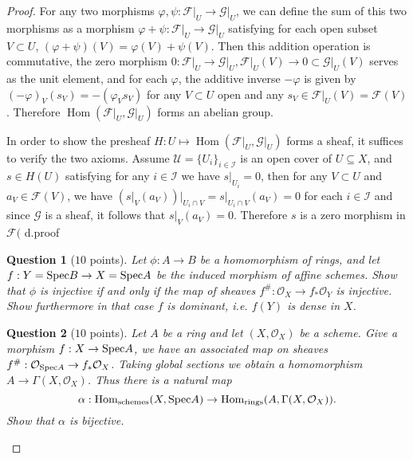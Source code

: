 \documentclass[12pt]{amsart}
\newcommand{\Hom}{\operatorname{Hom}}
\newtheorem{question}{Question}
\begin{document}
\begin{proof}
    For any two morphisms $\varphi ,\psi\colon\mathscr{F}\vert_U\to\mathscr{G}\vert_U $, we can define the sum of this two morphisms as a morphism $\varphi +\psi\colon\mathscr{F}\vert_U\to\mathscr{G}\vert_U $ satisfying for each open subset $V\subset U$, $(\varphi +\psi )(V) =\varphi (V)+\psi (V)$. Then this addition operation is commutative, the zero morphism $0\colon\mathscr{F}\vert_U\to\mathscr{G}\vert_U ,\mathscr{F}\vert_U (V)\to 0\subset\mathscr{G}\vert_U (V)$ serves as the unit element, and for each $\varphi $, the additive inverse $-\varphi $ is given by $(-\varphi )_V (s_V )=-(\varphi_V s_V )$ for any $V\subset U$ open and any $s_V\in\mathscr{F}\vert_U (V)=\mathscr{F} (V)$. Therefore $\Hom (\mathscr{F}\vert_U ,\mathscr{G}\vert_U )$ forms an abelian group.
    
    In order to show the presheaf $H\colon U\mapsto\Hom (\mathscr{F}\vert_U ,\mathscr{G}\vert_U )$ forms a sheaf, it suffices to verify the two axioms. Assume $\mathcal{U} =\{U_i\}_{i\in\mathcal{I} } $ is an open cover of $U\subseteq X$, and $s\in H(U)$ satisfying for any $i\in\mathcal{I} $ we have $s\vert_{U_i } =0$, then for any $V\subset U$ and $a_V\in\mathscr{F} (V)$, we have $(s\vert_V (a_V ))\vert_{U_i\cap V} =s\vert_{U_i\cap V} (a_V )=0$ for each $i\in\mathcal{I} $ and since $\mathscr{G} $ is a sheaf, it follows that $s\vert_V (a_V )=0$. Therefore $s$ is a zero morphism in $\mathscr{F} ($
\en d.{proof}

\begin{question}[$10$ points]
Let $\phi: A \to B$ be a homomorphism of rings, and let $f: Y ={\rm Spec} B \to X={\rm Spec} A$ be the induced morphism of affine schemes. Show that $\phi$ is injective if and only if the map of sheaves $f^\#: \mathcal O_X \to f_*\mathcal O_Y$ is injective. Show furthermore in that case $f$ is dominant, i.e. $f(Y)$ is dense in $X$.

\end{question}

\begin{question}[$10$ points]
Let $A$ be a ring and let $(X, \mathcal O_X)$ be a scheme. Give a morphism $f: X \to {\rm Spec} A$, we have an associated map on sheaves $f^\#: \mathcal{O}_{{\rm Spec} A} \to f_*\mathcal O_X$. Taking global sections we obtain a homomorphism $A \to \Gamma(X, \mathcal O_X)$. Thus there is a natural map
\[
\alpha: {\rm Hom}_{\rm schemes}(X, {\rm Spec} A) \to {\rm Hom}_{\rm rings}(A, \Gamma(X, \mathcal O_X)).
\] Show that $\alpha$ is bijective.


\end{question}
\end{proof}
\end{document}
